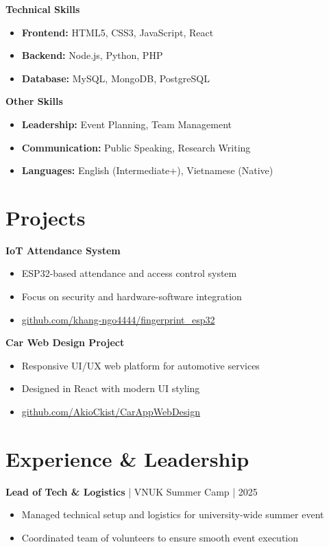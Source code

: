 \documentclass[11pt,a4paper]{article}
\begin{document}
\begin{multicols}{2}
\textbf{Technical Skills}
\begin{itemize}[leftmargin=*,nosep]
  \item \textbf{Frontend:} HTML5, CSS3, JavaScript, React
  \item \textbf{Backend:} Node.js, Python, PHP
  \item \textbf{Database:} MySQL, MongoDB, PostgreSQL
\end{itemize}

\columnbreak

\textbf{Other Skills}
\begin{itemize}[leftmargin=*,nosep]
  \item \textbf{Leadership:} Event Planning, Team Management
  \item \textbf{Communication:} Public Speaking, Research Writing
  \item \textbf{Languages:} English (Intermediate+), Vietnamese (Native)
\end{itemize}
\end{multicols}

\section{Projects}
\textbf{IoT Attendance System}
\begin{itemize}[leftmargin=*,nosep]
  \item ESP32-based attendance and access control system
  \item Focus on security and hardware-software integration
  \item \href{https://github.com/khang-ngo4444/fingerprint_esp32}{github.com/khang-ngo4444/fingerprint\_esp32}
\end{itemize}

\vspace{0.5em}
\textbf{Car Web Design Project}
\begin{itemize}[leftmargin=*,nosep]
  \item Responsive UI/UX web platform for automotive services
  \item Designed in React with modern UI styling
  \item \href{https://github.com/AkioCkist/CarAppWebDesign}{github.com/AkioCkist/CarAppWebDesign}
\end{itemize}

\section{Experience \& Leadership}
\textbf{Lead of Tech \& Logistics} | VNUK Summer Camp | 2025
\begin{itemize}[leftmargin=*,nosep]
  \item Managed technical setup and logistics for university-wide summer event
  \item Coordinated team of volunteers to ensure smooth event execution
\end{itemize}
\end{document}
